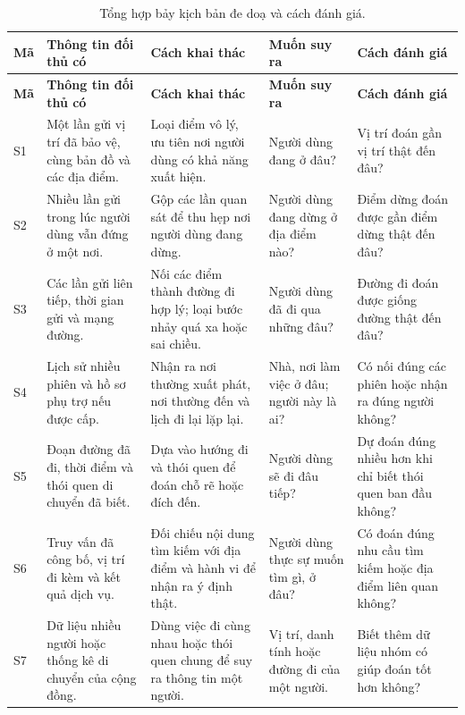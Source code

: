 \documentclass[12pt,a4paper,oneside]{report}
\begin{document}
\begingroup
\small
\begin{longtable}{P{1.15cm}P{3.0cm}P{3.1cm}P{2.6cm}P{2.8cm}}
\caption{Tổng hợp bảy kịch bản đe doạ và cách đánh giá.}
\label{tab:threatmap}\\
\toprule
\textbf{Mã} & \textbf{Thông tin đối thủ có} & \textbf{Cách khai thác} & \textbf{Muốn suy ra} & \textbf{Cách đánh giá} \\
\midrule
\endfirsthead
\toprule
\textbf{Mã} & \textbf{Thông tin đối thủ có} & \textbf{Cách khai thác} & \textbf{Muốn suy ra} & \textbf{Cách đánh giá} \\
\midrule
\endhead
S1 & Một lần gửi vị trí đã bảo vệ, cùng bản đồ và các địa điểm.
& Loại điểm vô lý, ưu tiên nơi người dùng có khả năng xuất hiện.
& Người dùng đang ở đâu?
& Vị trí đoán gần vị trí thật đến đâu? \\
\midrule
S2 & Nhiều lần gửi trong lúc người dùng vẫn đứng ở một nơi.
& Gộp các lần quan sát để thu hẹp nơi người dùng đang dừng.
& Người dùng đang dừng ở địa điểm nào?
& Điểm dừng đoán được gần điểm dừng thật đến đâu? \\
\midrule
S3 & Các lần gửi liên tiếp, thời gian gửi và mạng đường.
& Nối các điểm thành đường đi hợp lý; loại bước nhảy quá xa hoặc sai chiều.
& Người dùng đã đi qua những đâu?
& Đường đi đoán được giống đường thật đến đâu? \\
\midrule
S4 & Lịch sử nhiều phiên và hồ sơ phụ trợ nếu được cấp.
& Nhận ra nơi thường xuất phát, nơi thường đến và lịch đi lại lặp lại.
& Nhà, nơi làm việc ở đâu; người này là ai?
& Có nối đúng các phiên hoặc nhận ra đúng người không? \\
\midrule
S5 & Đoạn đường đã đi, thời điểm và thói quen di chuyển đã biết.
& Dựa vào hướng đi và thói quen để đoán chỗ rẽ hoặc đích đến.
& Người dùng sẽ đi đâu tiếp?
& Dự đoán đúng nhiều hơn khi chỉ biết thói quen ban đầu không? \\
\midrule
S6 & Truy vấn đã công bố, vị trí đi kèm và kết quả dịch vụ.
& Đối chiếu nội dung tìm kiếm với địa điểm và hành vi để nhận ra ý định thật.
& Người dùng thực sự muốn tìm gì, ở đâu?
& Có đoán đúng nhu cầu tìm kiếm hoặc địa điểm liên quan không? \\
\midrule
S7 & Dữ liệu nhiều người hoặc thống kê di chuyển của cộng đồng.
& Dùng việc đi cùng nhau hoặc thói quen chung để suy ra thông tin một người.
& Vị trí, danh tính hoặc đường đi của một người.
& Biết thêm dữ liệu nhóm có giúp đoán tốt hơn không? \\
\bottomrule
\end{longtable}
\endgroup
\end{document}

